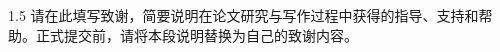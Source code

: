 \begin{zhixie}
\begin{spacing}{1.5}
请在此填写致谢，简要说明在论文研究与写作过程中获得的指导、支持和帮助。正式提交前，请将本段说明替换为自己的致谢内容。
\end{spacing}
\end{zhixie}
